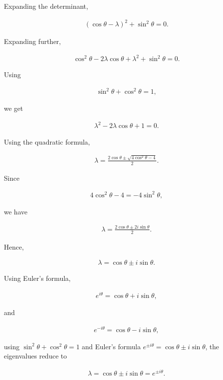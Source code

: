 \begin{enumerate}[label=\thesubsection.\arabic*,ref=\thesubsection.\theenumi]
Expanding the determinant,

\begin{align}
(\cos\theta-\lambda)^2+\sin^2\theta=0.
\end{align}

Expanding further,

\begin{align}
\cos^2\theta-2\lambda\cos\theta+\lambda^2
+\sin^2\theta=0.
\end{align}

Using

\begin{align}
\sin^2\theta+\cos^2\theta=1,
\end{align}

we get

\begin{align}
\lambda^2-2\lambda\cos\theta+1=0.
\end{align}

Using the quadratic formula,

\begin{align}
\lambda
=
\frac{2\cos\theta
\pm
\sqrt{4\cos^2\theta-4}}{2}.
\end{align}

Since

\begin{align}
4\cos^2\theta-4
=
-4\sin^2\theta,
\end{align}

we have

\begin{align}
\lambda
=
\frac{2\cos\theta
\pm
2i\sin\theta}{2}.
\end{align}

Hence,

\begin{align}
\lambda
=
\cos\theta\pm i\sin\theta.
\end{align}

Using Euler's formula,

\begin{align}
e^{i\theta}=\cos\theta+i\sin\theta,
\end{align}

and

\begin{align}
e^{-i\theta}=\cos\theta-i\sin\theta,
\end{align}

using $\sin^2\theta+\cos^2\theta=1$ and Euler's formula
$e^{\pm i\theta}=\cos\theta\pm i\sin\theta$, the eigenvalues reduce to

\begin{align}
\lambda=\cos\theta\pm i\sin\theta=e^{\pm i\theta}.
\end{align}


\end{enumerate}
